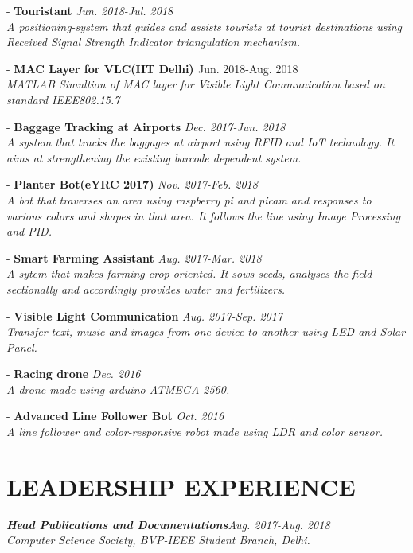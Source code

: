 \documentclass[margin, 10pt]{res} %
\begin{document}
\begin{resume}
- {\bf Touristant} 
{\sl \hfill {\normalfont Jun. 2018-Jul. 2018}\\ A positioning-system that guides and assists tourists at tourist destinations using Received Signal Strength Indicator triangulation mechanism. }

- {\bf {MAC Layer for VLC(IIT Delhi) }  }
 { \hfill \normalfont Jun. 2018-Aug. 2018}\\{\sl MATLAB Simultion of MAC layer for Visible Light Communication based on standard IEEE802.15.7}

- {\bf Baggage Tracking at Airports}
{\sl  \hfill {\normalfont Dec. 2017-Jun. 2018 }\\A system that tracks the baggages at airport using RFID and IoT technology. It aims at strengthening the existing barcode dependent system. }

- {\bf Planter Bot(eYRC 2017)} 
 {\sl \hfill {\normalfont Nov. 2017-Feb. 2018}\\A bot that traverses an area using raspberry pi and picam and responses to various colors and shapes in that area. It follows the line using Image Processing and PID.}

- {\bf Smart Farming Assistant}
{\sl \hfill{\normalfont Aug. 2017-Mar. 2018}\\ A sytem that makes farming crop-oriented. It sows seeds, analyses the field sectionally and accordingly provides water and fertilizers.}


- {\bf Visible Light Communication}
{\sl \hfill{\normalfont Aug. 2017-Sep. 2017}\\Transfer text, music and images from one device to another using LED and Solar Panel. }

- {\bf Racing drone}
{\sl  \hfill{\normalfont Dec. 2016}\\A drone made using arduino ATMEGA 2560.}

- {\bf Advanced Line Follower Bot} 
{\sl \hfill{\normalfont Oct. 2016}\\ A line follower and color-responsive robot made using LDR and color sensor.}



\section{LEADERSHIP EXPERIENCE}
{\sl {\bf Head Publications and Documentations}\hfill {\normalfont Aug. 2017-Aug. 2018 \\
Computer Science Society, BVP-IEEE Student Branch, Delhi.}

}
\end{resume}
\end{document}
